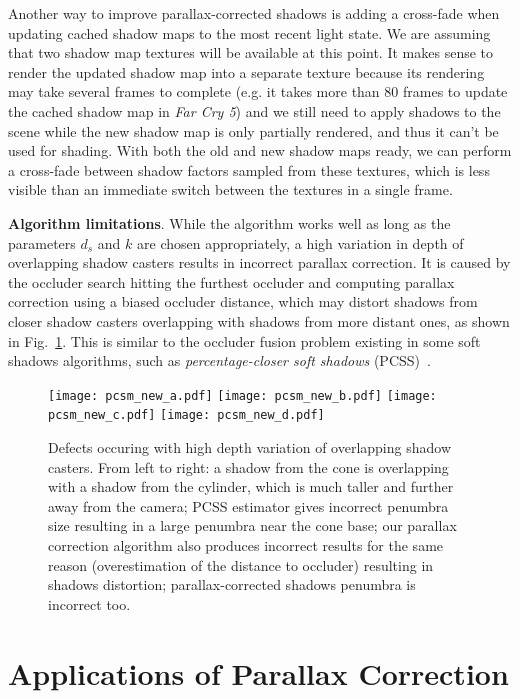 Another way to improve parallax-corrected shadows is adding a cross-fade 
when updating cached shadow maps to the most recent light state. We are assuming 
that two shadow map textures will be available at this point. It makes sense 
to render the updated shadow map into a separate texture because its rendering may take
several frames to complete (e.g. it takes more than 80 frames to update the cached shadow map 
in \textit{Far Cry 5}) and we still need to apply shadows to the scene while the new shadow map is 
only partially rendered, and thus it can't be used for shading. With both the old and new shadow
maps ready, we can perform a cross-fade between shadow factors sampled from these textures, which
is less visible than an immediate switch between the textures in a single frame.

\bigskip
\textbf{Algorithm limitations}. While the algorithm works well as long as the 
parameters $d_s$ and $k$ are chosen appropriately, a high variation in depth of
overlapping shadow casters results in incorrect parallax correction. It is
caused by the occluder search hitting the furthest occluder and computing parallax
correction using a biased occluder distance, which may distort shadows from closer
shadow casters overlapping with shadows from more distant ones, as shown in Fig.~\ref{Fig:FusionProblem}.
This is similar to the occluder fusion problem existing in some soft shadows algorithms, such as
\textit{percentage-closer soft shadows} (PCSS)~\cite{PCSS}.

\begin{figure}[t]
\texttt{[image: pcsm\_new\_a.pdf]}
\texttt{[image: pcsm\_new\_b.pdf]}
\texttt{[image: pcsm\_new\_c.pdf]}
\texttt{[image: pcsm\_new\_d.pdf]}
\caption{\small Defects occuring with high depth variation of overlapping shadow casters. From left to right: a shadow from the cone is
overlapping with a shadow from the cylinder, which is much taller and further away from the camera;
PCSS estimator gives incorrect penumbra size resulting in a large penumbra near the cone base; our parallax correction algorithm also
produces incorrect results for the same reason (overestimation of the distance to occluder) resulting in shadows distortion; 
parallax-corrected shadows penumbra is incorrect too.}
\label{Fig:FusionProblem}
\end{figure}

\section{Applications of Parallax Correction}

